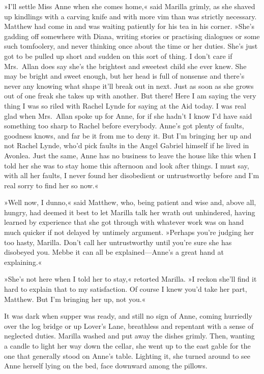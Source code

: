 »I'll settle Miss Anne when she comes home,« said Marilla grimly, as she shaved up kindlings with a carving knife and with more vim than was strictly necessary. Matthew had come in and was waiting patiently for his tea in his corner. »She's gadding off somewhere with Diana, writing stories or practising dialogues or some such tomfoolery, and never thinking once about the time or her duties. She's just got to be pulled up short and sudden on this sort of thing. I don't care if Mrs.~Allan does say she's the brightest and sweetest child she ever knew. She may be bright and sweet enough, but her head is full of nonsense and there's never any knowing what shape it'll break out in next. Just as soon as she grows out of one freak she takes up with another. But there! Here I am saying the very thing I was so riled with Rachel Lynde for saying at the Aid today. I was real glad when Mrs.~Allan spoke up for Anne, for if she hadn't I know I'd have said something too sharp to Rachel before everybody. Anne's got plenty of faults, goodness knows, and far be it from me to deny it. But I'm bringing her up and not Rachel Lynde, who'd pick faults in the Angel Gabriel himself if he lived in Avonlea. Just the same, Anne has no business to leave the house like this when I told her she was to stay home this afternoon and look after things. I must say, with all her faults, I never found her disobedient or untrustworthy before and I'm real sorry to find her so now.«

»Well now, I dunno,« said Matthew, who, being patient and wise and, above all, hungry, had deemed it best to let Marilla talk her wrath out unhindered, having learned by experience that she got through with whatever work was on hand much quicker if not delayed by untimely argument. »Perhaps you're judging her too hasty, Marilla. Don't call her untrustworthy until you're sure she has disobeyed you. Mebbe it can all be explained—Anne's a great hand at explaining.«

»She's not here when I told her to stay,« retorted Marilla. »I reckon she'll find it hard to explain that to my satisfaction. Of course I knew you'd take her part, Matthew. But I'm bringing her up, not you.«

It was dark when supper was ready, and still no sign of Anne, coming hurriedly over the log bridge or up Lover's Lane, breathless and repentant with a sense of neglected duties. Marilla washed and put away the dishes grimly. Then, wanting a candle to light her way down the cellar, she went up to the east gable for the one that generally stood on Anne's table. Lighting it, she turned around to see Anne herself lying on the bed, face downward among the pillows.


